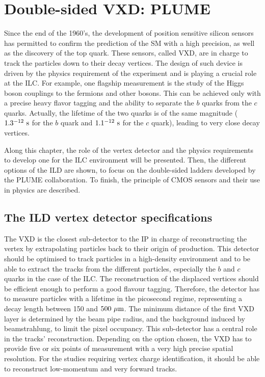 \chapter{Double-sided VXD: PLUME}
\label{chap:vxd}
  
  Since the end of the 1960's, the development of position sensitive silicon sensors has permitted to confirm the prediction of the \acrfull{SM} with a high precision, as well as the discovery of the top quark.
  These sensors, called \acrfull{VXD}, are in charge to track the particles down to their decay vertices.
  The design of such device is driven by the physics requirement of the experiment and is playing a crucial role at the \acrfull{ILC}.
  For example, one flagship measurement is the study of the Higgs boson couplings to the fermions and other bosons.
  This can be achieved only with a precise heavy flavor tagging and the ability to separate the $b$ quarks from the $c$ quarks. 
  Actually, the lifetime of the two quarks is of the same magnitude ($1.3 \time 10^{-12}~\rm{s}$ for the $b$ quark and $1.1 \time 10^{-12}~\rm{s}$ for the $c$ quark), leading to very close decay vertices. 
  
  Along this chapter, the role of the vertex detector and the physics requirements to develop one for the \gls{ILC} environment will be presented.
  Then, the different options of the \acrfull{ILD} are shown, to focus on the double-sided ladders developed by the \gls{PLUME} collaboration.
  To finish, the principle of \gls{CMOS} sensors and their use in physics are described.

  \minitoc
  
  \section{The ILD vertex detector specifications}
   
    The \gls{VXD} is the closest sub-detector to the \acrfull{IP} in charge of reconstructing the vertex by extrapolating particles back to their origin of production. 
    This detector should be optimised to track particles in a high-density environment and to be able to extract the tracks from the different particles, especially the $b$ and $c$ quarks in the case of the \gls{ILC}.
    The reconstruction of the displaced vertices should be efficient enough to perform a good flavour tagging.
    Therefore, the detector has to measure particles with a lifetime in the picosecond regime, representing a decay length between 150 and $500~\rm{\mu m}$.
    The minimum distance of the first \gls{VXD} layer is determined by the beam pipe radius, and the background induced by beamstrahlung, to limit the pixel occupancy.
    This sub-detector has a central role in the tracks' reconstruction.
    Depending on the option chosen, the \gls{VXD} has to provide five or six points of measurement with a very high precise spatial resolution.
    For the studies requiring vertex charge identification, it should be able to reconstruct low-momentum and very forward tracks.

